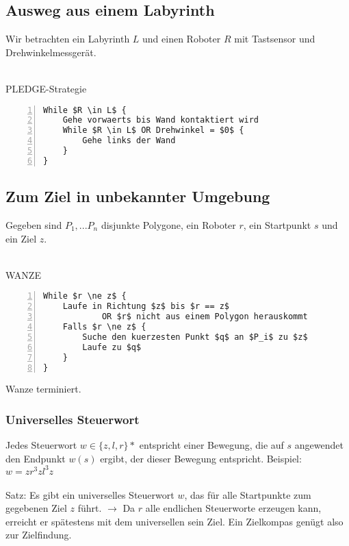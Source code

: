 \subsection{Ausweg aus einem Labyrinth}
Wir betrachten ein Labyrinth \(L\) und einen Roboter \(R\) mit Tastsensor und Drehwinkelmessgerät.
\\\\
\begin{minipage}{\textwidth}
PLEDGE-Strategie
\begin{lstlisting}[frame=single,numbers=left,mathescape]
While $R \in L$ {
	Gehe vorwaerts bis Wand kontaktiert wird
	While $R \in L$ OR Drehwinkel = $0$ {
		Gehe links der Wand
	}
}
\end{lstlisting}
\end{minipage}


\subsection{Zum Ziel in unbekannter Umgebung}
Gegeben sind \(P_1,...P_n\) disjunkte Polygone, ein Roboter \(r\), ein Startpunkt \(s\) und ein Ziel \(z\).
\\\\
\begin{minipage}{\textwidth}
WANZE
\begin{lstlisting}[frame=single,numbers=left,mathescape]
While $r \ne z$ {
	Laufe in Richtung $z$ bis $r == z$
			OR $r$ nicht aus einem Polygon herauskommt
	Falls $r \ne z$ {
		Suche den kuerzesten Punkt $q$ an $P_i$ zu $z$
		Laufe zu $q$
	}
}
\end{lstlisting}
\end{minipage}
Wanze terminiert.

\subsubsection{Universelles Steuerwort}
Jedes Steuerwort \(w \in \{z,l,r\}*\) entspricht einer Bewegung, die auf \(s\) angewendet den Endpunkt \(w(s)\) ergibt, der dieser Bewegung entspricht. Beispiel: \(w = zr^3zl^3z\)
\\\\
Satz: Es gibt ein universelles Steuerwort \(w\), das für alle Startpunkte zum gegebenen Ziel \(z\) führt. \(\rightarrow \) Da \(r\) alle endlichen Steuerworte erzeugen kann, erreicht er spätestens mit dem universellen sein Ziel. Ein Zielkompas genügt also zur Zielfindung.


